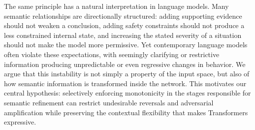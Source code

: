 \documentclass{article}
\theoremstyle{plain}
\theoremstyle{definition}
\theoremstyle{remark}
\begin{document}
The same principle has a natural interpretation in language models. Many semantic relationships are directionally structured: adding supporting evidence should not weaken a conclusion, adding safety constraints should not produce a less constrained internal state, and increasing the stated severity of a situation should not make the model more permissive. Yet contemporary language models often violate these expectations, with seemingly clarifying or restrictive information producing unpredictable or even regressive changes in behavior. We argue that this instability is not simply a property of the input space, but also of how semantic information is transformed inside the network. This motivates our central hypothesis: selectively enforcing monotonicity in the stages responsible for semantic refinement can restrict undesirable reversals and adversarial amplification while preserving the contextual flexibility that makes Transformers expressive.






\end{document}
